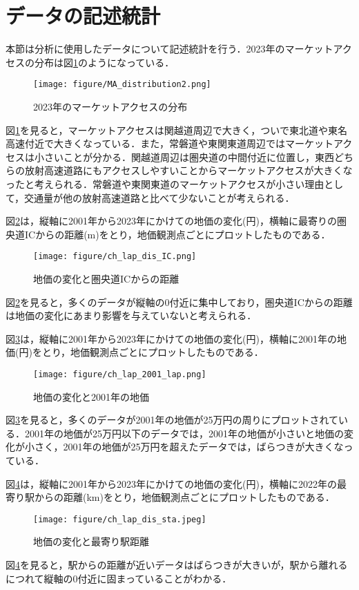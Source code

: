 \section{データの記述統計}
 本節は分析に使用したデータについて記述統計を行う．2023年のマーケットアクセスの分布は図\ref{MA_2023_distribution}のようになっている．
 \begin{figure}[H]
  \centering
  \texttt{[image: figure/MA\_distribution2.png]}
  \caption{2023年のマーケットアクセスの分布}
  \label{MA_2023_distribution}
\end{figure}
図\ref{MA_2023_distribution}を見ると，マーケットアクセスは関越道周辺で大きく，ついで東北道や東名高速付近で大きくなっている．また，常磐道や東関東道周辺ではマーケットアクセスは小さいことが分かる．関越道周辺は圏央道の中間付近に位置し，東西どちらの放射高速道路にもアクセスしやすいことからマーケットアクセスが大きくなったと考えられる．常磐道や東関東道のマーケットアクセスが小さい理由として，交通量が他の放射高速道路と比べて少ないことが考えられる．

図\ref{deruta_landprice disIC_m}は，縦軸に2001年から2023年にかけての地価の変化(円)，横軸に最寄りの圏央道ICからの距離(m)をとり，地価観測点ごとにプロットしたものである．
\begin{figure}[H]
  \centering
  \texttt{[image: figure/ch\_lap\_dis\_IC.png]}
  \caption{地価の変化と圏央道ICからの距離}
  \label{deruta_landprice disIC_m}
\end{figure}
図\ref{deruta_landprice disIC_m}を見ると，多くのデータが縦軸の0付近に集中しており，圏央道ICからの距離は地価の変化にあまり影響を与えていないと考えられる．

図\ref{deruta_landprice_H13_landprice}は，縦軸に2001年から2023年にかけての地価の変化(円)，横軸に2001年の地価(円)をとり，地価観測点ごとにプロットしたものである．
\begin{figure}[H]
  \centering
  \texttt{[image: figure/ch\_lap\_2001\_lap.png]}
  \caption{地価の変化と2001年の地価}
  \label{deruta_landprice_H13_landprice}
\end{figure}
図\ref{deruta_landprice_H13_landprice}を見ると，多くのデータが2001年の地価が25万円の周りにプロットされている．2001年の地価が25万円以下のデータでは，2001年の地価が小さいと地価の変化が小さく，2001年の地価が25万円を超えたデータでは，ばらつきが大きくなっている．

図\ref{deruta_landprice_dis_sta}は，縦軸に2001年から2023年にかけての地価の変化(円)，横軸に2022年の最寄り駅からの距離(km)をとり，地価観測点ごとにプロットしたものである．
\begin{figure}[H]
  \centering
  \texttt{[image: figure/ch\_lap\_dis\_sta.jpeg]}
  \caption{地価の変化と最寄り駅距離}
  \label{deruta_landprice_dis_sta}
\end{figure}
図\ref{deruta_landprice_dis_sta}を見ると，駅からの距離が近いデータはばらつきが大きいが，駅から離れるにつれて縦軸の0付近に固まっていることがわかる．

